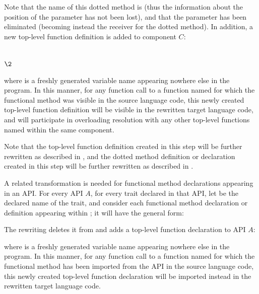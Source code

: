 Note that the name of this dotted method is  (thus the information about the position of
the  parameter has not been lost), and that the  parameter has been eliminated (becoming
instead the receiver for the dotted method).  In addition, a new top-level function definition is added to
component $C$:
\begin{codeexamplesize}
\begin{tabbing}
 \\
\(\2\)
\end{tabbing}
\end{codeexamplesize}
where  is a freshly generated variable name appearing nowhere else in the program.
In this manner, for any function call to a function named  for which the functional
method was visible in the source language code, this newly created top-level function definition
will be visible in the rewritten target language code, and will participate in overloading
resolution with any other top-level functions named  within the same component.

Note that the top-level function definition created in this step will be further rewritten
as described in ,
and the dotted method definition or declaration created in this step will be further rewritten
as described in .

A related transformation is needed for functional method declarations appearing in an API.
For every API $A$, for every trait declared in that API,
let  be the declared name of the trait, and
consider each functional method declaration or definition appearing
within ; it will have the general form:
\begin{codeexamplesize}
\begin{tabbing}
\end{tabbing}
\end{codeexamplesize}
The rewriting deletes it from  and adds a top-level function declaration to API $A$:
\begin{codeexamplesize}
\begin{tabbing}
\end{tabbing}
\end{codeexamplesize}
where  is a freshly generated variable name appearing nowhere else in the program.
In this manner, for any function call to a function named  for which the functional
method has been imported from the API in the source language code, this newly created top-level function declaration
will be imported instead in the rewritten target language code.

